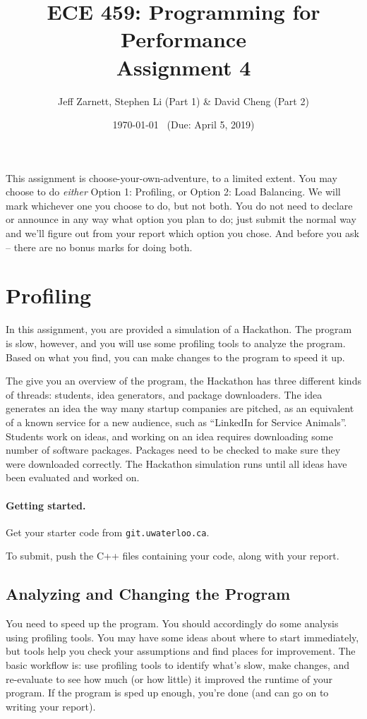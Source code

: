 \documentclass[letterpaper,10pt]{article}
\title{\bf ECE 459: Programming for Performance\\Assignment 4}
\author{Jeff Zarnett, Stephen Li (Part 1) \& David Cheng (Part 2)}
\date{\today ~ (Due: April 5, 2019)}
\begin{document}
\maketitle

This assignment is choose-your-own-adventure, to a limited extent. You may choose to do \textit{either} Option 1: Profiling, or Option 2: Load Balancing. We will mark whichever one you choose to do, but not both. You do not need to declare or announce in any way what option you plan to do; just submit the normal way and we'll figure out from your report which option you chose. And before you ask -- there are no bonus marks for doing both. 


\section{Profiling}

In this assignment, you are provided a simulation of a Hackathon. The program is slow, however, and you will use some profiling tools to analyze the program. Based on what you find, you can make changes to the program to speed it up. 

The give you an overview of the program, the Hackathon has three different kinds of threads: students, idea generators, and package downloaders. The idea generates an idea the way many startup companies are pitched, as an equivalent of a known service for a new audience, such as ``LinkedIn for Service Animals''. Students work on ideas, and working on an idea requires downloading some number of software packages. Packages need to be checked to make sure they were downloaded correctly. The Hackathon simulation runs until all ideas have been evaluated and worked on.

\paragraph{Getting started.} Get your starter code from \texttt{git.uwaterloo.ca}.

To submit, push the C++ files containing your code, along with your report.

\subsection{Analyzing and Changing the Program}

You need to speed up the program. You should accordingly do some analysis using profiling tools. You may have some ideas about where to start immediately, but tools help you check your assumptions and find places for improvement. The basic workflow is: use profiling tools to identify what's slow, make changes, and re-evaluate to see how much (or how little) it improved the runtime of your program. If the program is sped up enough, you're done (and can go on to writing your report).
\end{document}
